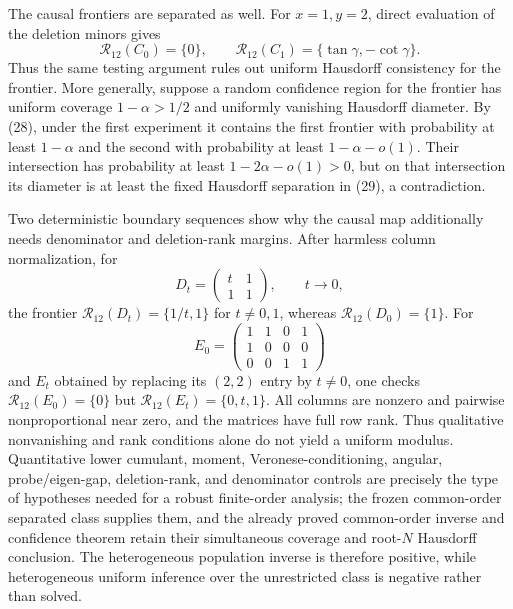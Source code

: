 The causal frontiers are separated as well. For \(x=1,y=2\), direct evaluation of the deletion minors gives
\[
 \mathcal R_{12}(C_0)=\{0\},
 \qquad
 \mathcal R_{12}(C_1)=\{\tan\gamma,-\cot\gamma\}. \tag{29}
\]
Thus the same testing argument rules out uniform Hausdorff consistency for the frontier. More generally, suppose a random confidence region for the frontier has uniform coverage \(1-\alpha>1/2\) and uniformly vanishing Hausdorff diameter. By (28), under the first experiment it contains the first frontier with probability at least \(1-\alpha\) and the second with probability at least \(1-\alpha-o(1)\). Their intersection has probability at least \(1-2\alpha-o(1)>0\), but on that intersection its diameter is at least the fixed Hausdorff separation in (29), a contradiction.

Two deterministic boundary sequences show why the causal map additionally needs denominator and deletion-rank margins. After harmless column normalization, for
\[
 D_t=\begin{pmatrix}t&1\\1&1\end{pmatrix},\qquad t\to0,
\]
the frontier \(\mathcal R_{12}(D_t)=\{1/t,1\}\) for \(t\ne0,1\), whereas \(\mathcal R_{12}(D_0)=\{1\}\). For
\[
 E_0=\begin{pmatrix}1&1&0&1\\1&0&0&0\\0&0&1&1\end{pmatrix}
\]
and \(E_t\) obtained by replacing its \((2,2)\) entry by \(t\ne0\), one checks \(\mathcal R_{12}(E_0)=\{0\}\) but \(\mathcal R_{12}(E_t)=\{0,t,1\}\). All columns are nonzero and pairwise nonproportional near zero, and the matrices have full row rank. Thus qualitative nonvanishing and rank conditions alone do not yield a uniform modulus. Quantitative lower cumulant, moment, Veronese-conditioning, angular, probe/eigen-gap, deletion-rank, and denominator controls are precisely the type of hypotheses needed for a robust finite-order analysis; the frozen common-order separated class supplies them, and the already proved common-order inverse and confidence theorem retain their simultaneous coverage and root-\(N\) Hausdorff conclusion. The heterogeneous population inverse is therefore positive, while heterogeneous uniform inference over the unrestricted class is negative rather than solved.